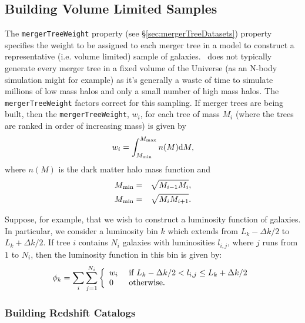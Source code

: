 \subsection{Building Volume Limited Samples}\label{sec:volumeLimitedSamples}

The {\tt mergerTreeWeight} property (see \S\ref{sec:mergerTreeDatasets}) property specifies the weight to be assigned to each merger tree in a model to construct a representative (i.e. volume limited) sample of galaxies. \glc\ does not typically generate every merger tree in a fixed volume of the Universe (as an N-body simulation might for example) as it's generally a waste of time to simulate millions of low mass halos and only a small number of high mass halos. The {\tt mergerTreeWeight} factors correct for this sampling. If merger trees are being built, then the {\tt mergerTreeWeight}, $w_i$, for each tree of mass $M_i$ (where the trees are ranked in order of increasing mass) is given by
\begin{equation}
 w_i = \int_{M_{\rm min}}^{M_{\rm max}} n(M) {\rm d}M,
\end{equation}
where $n(M)$ is the dark matter halo mass function and
\begin{eqnarray}
 M_{\rm min} &=& \sqrt{M_{i-1}M_i}, \\
 M_{\rm min} &=& \sqrt{M_i M_{i+1}}.
\end{eqnarray}

Suppose, for example, that we wish to construct a luminosity function of galaxies. In particular, we consider a luminosity bin $k$ which extends from $L_k-\Delta k/2$ to $L_k+\Delta k/2$. If tree $i$ contains $N_i$ galaxies with luminosities $l_{i,j}$, where $j$ runs from $1$ to $N_i$, then the luminosity function in this bin is given by:
\begin{equation}
 \phi_k = \sum_i \sum_{j=1}^{N_i} \left\{ \begin{array}{ll} w_i & \hbox{ if  } L_k-\Delta k/2 < l_{i,j} \le L_k+\Delta k/2 \\ 0 & \hbox{ otherwise.} \end{array} \right.
\end{equation}

\subsubsection{Building Redshift Catalogs}\label{sec:Galacticus::Survey}

